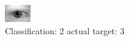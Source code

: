 \begin{figure}[h!]
\begin{center}
\includegraphics[width=0.60\columnwidth]{figures/ID566_class_2_target_3.png}
\end{center}
\caption{ Classification: 2 actual target: 3}
\label{fig:ID566_class_2_target_3}
\end{figure}
